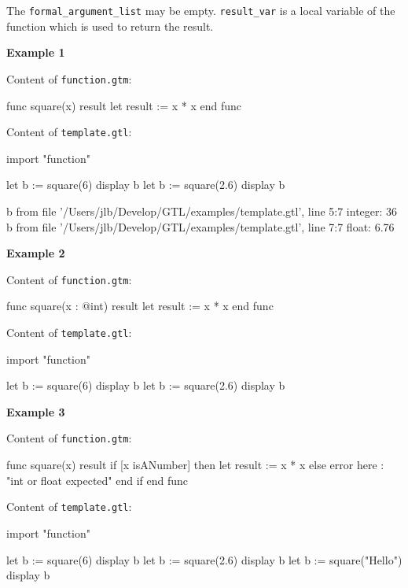 \documentclass[10pt,openright,twosides,final]{memoir}
\newcommand{\gtlinline}[1]{\colorbox{light-blue}{\lstinline[language=gtl]{#1}}}
\newcommand{\examplen}[1]{\vspace{.75em}\noindent\textbf{Example #1}\vspace{0em}}
\begin{document}
The \gtlinline{formal_argument_list} may be empty. \gtlinline{result_var} is a local variable of the function which is used to return the result.

\examplen{1}

\noindent Content of \texttt{\footnotesize function.gtm}:
\begin{gtl}
func square(x) result
  let result := x * x
end func
\end{gtl}
\noindent Content of \texttt{\footnotesize template.gtl}:
\begin{gtl}
import "function"

let b := square(6)
display b
let b := square(2.6)
display b
\end{gtl}
\begin{console}
b from file '/Users/jlb/Develop/GTL/examples/template.gtl', line 5:7
    integer: 36
b from file '/Users/jlb/Develop/GTL/examples/template.gtl', line 7:7
    float: 6.76
\end{console}

\examplen{2}

\noindent Content of \texttt{\footnotesize function.gtm}:
\begin{gtl}
func square(x : @int) result
  let result := x * x
end func
\end{gtl}
\noindent Content of \texttt{\footnotesize template.gtl}:
\begin{gtl}
import "function"

let b := square(6)
display b
let b := square(2.6)
display b
\end{gtl}

\examplen{3}

\noindent Content of \texttt{\footnotesize function.gtm}:
\begin{gtl}
func square(x) result
  if [x isANumber] then
    let result := x * x
  else
    error here : "int or float expected"
  end if
end func
\end{gtl}
\noindent Content of \texttt{\footnotesize template.gtl}:
\begin{gtl}
import "function"

let b := square(6)
display b
let b := square(2.6)
display b
let b := square("Hello")
display b
\end{gtl}
\end{document}
